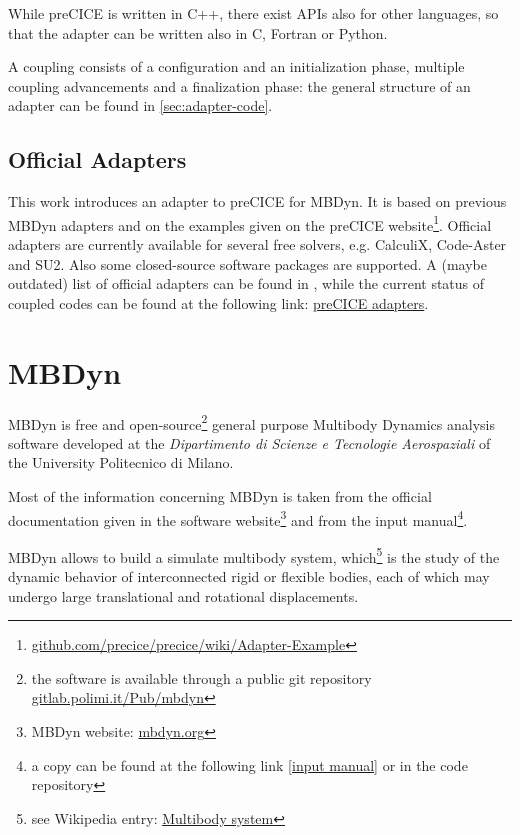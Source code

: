 While preCICE is written in C++, there exist APIs also for other languages, so that the adapter can be written also in C, Fortran or Python.

A coupling consists of a configuration and an initialization phase, multiple coupling advancements and a finalization phase: the general structure of an adapter can be found in \ref{sec:adapter-code}.


\subsection{Official Adapters}
\label{sec:pc-adapters}


This work introduces an adapter to preCICE for MBDyn. It is based on previous MBDyn adapters and on the examples given on the preCICE website\footnote{\href{https://github.com/precice/precice/wiki/Adapter-Example}{github.com/precice/precice/wiki/Adapter-Example}}.
Official adapters are currently available for several free solvers, e.g. CalculiX, Code-Aster and SU2. Also some closed-source software packages are supported. A (maybe outdated) list of official adapters can be found in \cite{uekermann2017official}, while the current status of coupled codes can be found at the following link: \href{https://www.precice.org/codes/}{preCICE adapters}.


\section{MBDyn}
\label{sec:mbdyn}


MBDyn is free and open-source\footnote{the software is available through a public git repository \href{https://gitlab.polimi.it/Pub/mbdyn}{gitlab.polimi.it/Pub/mbdyn}} general purpose Multibody Dynamics analysis software developed at the \textit{Dipartimento di Scienze e Tecnologie Aerospaziali}  of the University Politecnico di Milano.

Most of the information concerning MBDyn is taken from the official documentation given in the software website\footnote{MBDyn website: \href{https://www.mbdyn.org/}{mbdyn.org}} and from the input manual\footnote{a copy can be found at the following link [\href{https://www.mbdyn.org/userfiles/documents/mbdyn-input-1.7.3.pdf}{input manual}] or in the code repository}.

MBDyn allows to build a simulate multibody system, which\footnote{see Wikipedia entry: \href{https://en.wikipedia.org/wiki/Multibody_system}{Multibody system}} is the study of the dynamic behavior of interconnected rigid or flexible bodies, each of which may undergo large translational and rotational displacements.

